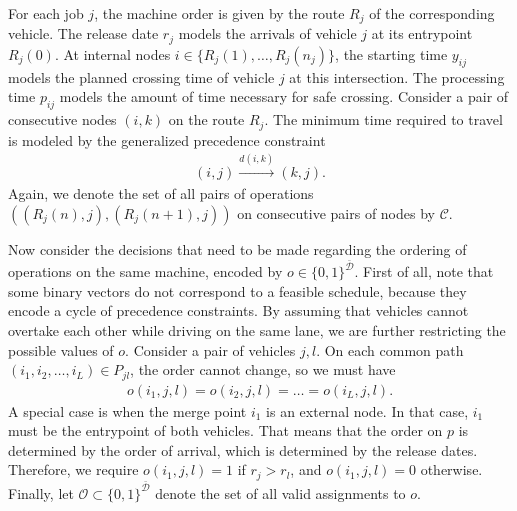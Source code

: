 \documentclass{article}
\theoremstyle{definition}
\theoremstyle{plain}
\begin{document}
For each job $j$, the machine order is given by the route $R_{j}$ of the
corresponding vehicle. The release date $r_{j}$ models the arrivals of vehicle
$j$ at its entrypoint $R_{j}(0)$. At internal nodes
$i \in \{R_{j}(1), \dots, R_{j}(n_{j})\}$, the starting time $y_{ij}$ models the
planned crossing time of vehicle $j$ at this intersection. The processing time
$p_{ij}$ models the amount of time necessary for safe crossing. Consider a pair
of consecutive nodes $(i,k)$ on the route $R_{j}$. The minimum time required to
travel is modeled by the generalized precedence constraint
\begin{align}
  (i,j) \xrightarrow{d(i,k)} (k,j) .
\end{align}
Again, we denote the set of all pairs of operations
$((R_{j}(n), j), (R_{j}(n+1), j))$ on consecutive pairs of nodes by
$\mathcal{C}$.


Now consider the decisions that need to be made regarding the ordering of
operations on the same machine, encoded by $o \in \{0,1\}^{\bar{\mathcal{D}}}$.
First of all, note that some binary vectors do not correspond to a feasible
schedule, because they encode a cycle of precedence constraints. By assuming
that vehicles cannot overtake each other while driving on the same lane, we are
further restricting the possible values of $o$. Consider a pair of vehicles
$j,l$. On each common path $(i_{1}, i_{2}, \dots, i_{L}) \in P_{jl}$, the order
cannot change, so we must have
\begin{align}
  o(i_{1},j,l) = o(i_{2},j,l) = \dots = o(i_{L},j,l).
\end{align}
A special case is when the merge point $i_{1}$ is an external node. In that
case, $i_{1}$ must be the entrypoint of both vehicles. That means that the order
on $p$ is determined by the order of arrival, which is determined by the release
dates. Therefore, we require $o(i_{1},j,l) = 1$ if $r_{j} > r_{l}$, and
$o(i_{1},j,l) = 0$ otherwise.
Finally, let $\mathcal{O} \subset \{0,1\}^{\bar{\mathcal{D}}}$ denote the set of
all valid assignments to $o$.
\end{document}
